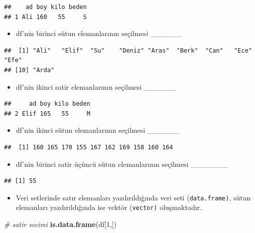 \documentclass[
  oneside]{book}
\newenvironment{Shaded}{\begin{snugshade}}{\end{snugshade}}
\newcommand{\CommentTok}[1]{\textcolor[rgb]{0.56,0.35,0.01}{\textit{#1}}}
\newcommand{\DecValTok}[1]{\textcolor[rgb]{0.00,0.00,0.81}{#1}}
\newcommand{\FunctionTok}[1]{\textcolor[rgb]{0.13,0.29,0.53}{\textbf{#1}}}
\newcommand{\NormalTok}[1]{#1}
\providecommand{\tightlist}{%
  \setlength{\itemsep}{0pt}\setlength{\parskip}{0pt}}
\begin{document}
\begin{verbatim}
##    ad boy kilo beden
## 1 Ali 160   55     S
\end{verbatim}

\begin{itemize}
\tightlist
\item
  df'nin birinci sütun elemanlarının seçilmesi \_\_\_\_\_\_
\end{itemize}

\begin{verbatim}
##  [1] "Ali"   "Elif"  "Su"    "Deniz" "Aras"  "Berk"  "Can"   "Ece"   "Efe"  
## [10] "Arda"
\end{verbatim}

\begin{itemize}
\tightlist
\item
  df'nin ikinci satir elemanlarının seçilmesi \_\_\_\_\_\_
\end{itemize}

\begin{verbatim}
##     ad boy kilo beden
## 2 Elif 165   55     M
\end{verbatim}

\begin{itemize}
\tightlist
\item
  df'nin ikinci sütun elemanlarının seçilmesi \_\_\_\_\_\_
\end{itemize}

\begin{verbatim}
##  [1] 160 165 170 155 167 162 169 158 160 164
\end{verbatim}

\begin{itemize}
\tightlist
\item
  df'nin birinci satir üçüncü sütun elemanlarının seçilmesi \_\_\_\_\_\_\_
\end{itemize}

\begin{verbatim}
## [1] 55
\end{verbatim}

\begin{itemize}
\tightlist
\item
  Veri setlerinde satır elemanları yazdırıldığında veri seti (\texttt{data.frame)}, sütun elemanları yazdırıldığında ise vektör (\texttt{vector)} oluşmaktadır.
\end{itemize}

\begin{Shaded}
\begin{Highlighting}[]
\CommentTok{\# satir secimi}
\FunctionTok{is.data.frame}\NormalTok{(df[}\DecValTok{1}\NormalTok{,])}
\end{Highlighting}
\end{Shaded}
\end{document}
